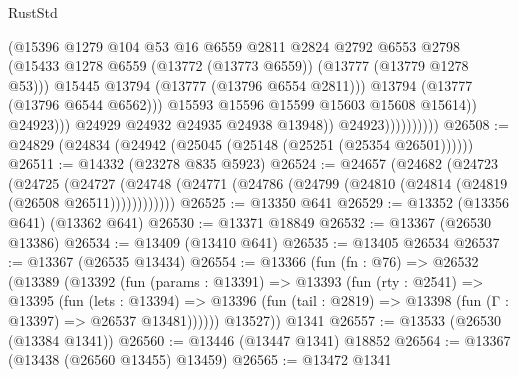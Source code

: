 \begin{lexlean}{RustStd}
\begin{coremodule}
                                        (@15396
                                          @1279
                                          @104
                                          @53
                                          @16
                                          @6559
                                          @2811
                                          @2824
                                          @2792
                                          @6553
                                          @2798
                                          (@15433
                                            @1278
                                            @6559
                                            (@13772 (@13773 @6559))
                                            (@13777 (@13779 @1278 @53)))
                                          @15445
                                          @13794
                                          (@13777 (@13796 @6554 @2811)))
                                        @13794
                                        (@13777 (@13796 @6544 @6562)))
                                      @15593
                                      @15596
                                      @15599
                                      @15603
                                      @15608
                                      @15614))
                                  @24923)))
                            @24929
                            @24932
                            @24935
                            @24938
                            @13948))
                        @24923))))))))))
@26508 := @24829 (@24834 (@24942 (@25045 (@25148 (@25251 (@25354 @26501))))))
@26511 := @14332 (@23278 @835 @5923)
@26524 := @24657
    (@24682
      (@24723
        (@24725
          (@24727 (@24748 (@24771 (@24786 (@24799 (@24810 (@24814 (@24819 (@26508 @26511))))))))))))
@26525 := @13350 @641
@26529 := @13352 (@13356 @641) (@13362 @641)
@26530 := @13371 @18849
@26532 := @13367 (@26530 @13386)
@26534 := @13409 (@13410 @641)
@26535 := @13405 @26534
@26537 := @13367 (@26535 @13434)
@26554 := @13366
    (fun (fn : @76) =>
    @26532
      (@13389
        (@13392
          (fun (params : @13391) =>
          @13393
            (fun (rty : @2541) =>
            @13395
              (fun (lets : @13394) =>
              @13396 (fun (tail : @2819) => @13398 (fun (Γ : @13397) => @26537 @13481))))))
        @13527))
    @1341
@26557 := @13533 (@26530 (@13384 @1341))
@26560 := @13446 (@13447 @1341) @18852
@26564 := @13367 (@13438 (@26560 @13455) @13459)
@26565 := @13472 @1341

\end{coremodule}
\end{lexlean}
